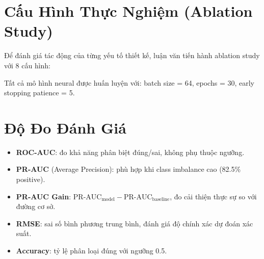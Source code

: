 \section{Cấu Hình Thực Nghiệm (Ablation Study)}
\label{sec:configs}

Để đánh giá tác động của từng yếu tố thiết kế, luận văn tiến hành ablation study với 8 cấu hình:

\begin{table}[H]
  \centering
  \caption{Các cấu hình trong ablation study}
  \label{tab:configs}
\end{table}

Tất cả mô hình neural được huấn luyện với: batch size = 64, epochs = 30, early stopping patience = 5.

\section{Độ Đo Đánh Giá}
\label{sec:metrics}

\begin{itemize}
  \item \textbf{ROC-AUC}: đo khả năng phân biệt đúng/sai, không phụ thuộc ngưỡng.
  \item \textbf{PR-AUC} (Average Precision): phù hợp khi class imbalance cao (82.5\% positive).
  \item \textbf{PR-AUC Gain}: $\text{PR-AUC}_{\text{model}} - \text{PR-AUC}_{\text{baseline}}$, đo cải thiện thực sự so với đường cơ sở.
  \item \textbf{RMSE}: sai số bình phương trung bình, đánh giá độ chính xác dự đoán xác suất.
  \item \textbf{Accuracy}: tỷ lệ phân loại đúng với ngưỡng 0.5.
\end{itemize}

